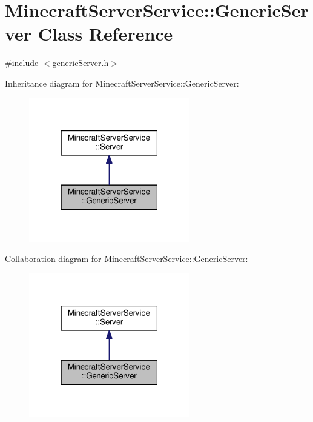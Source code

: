 \hypertarget{class_minecraft_server_service_1_1_generic_server}{}\section{Minecraft\+Server\+Service\+:\+:Generic\+Server Class Reference}
\label{class_minecraft_server_service_1_1_generic_server}


{\ttfamily \#include $<$generic\+Server.\+h$>$}



Inheritance diagram for Minecraft\+Server\+Service\+:\+:Generic\+Server\+:\nopagebreak
\begin{figure}[H]
\begin{center}
\leavevmode
\includegraphics[width=199pt]{class_minecraft_server_service_1_1_generic_server__inherit__graph}
\end{center}
\end{figure}


Collaboration diagram for Minecraft\+Server\+Service\+:\+:Generic\+Server\+:\nopagebreak
\begin{figure}[H]
\begin{center}
\leavevmode
\includegraphics[width=199pt]{class_minecraft_server_service_1_1_generic_server__coll__graph}
\end{center}
\end{figure}
